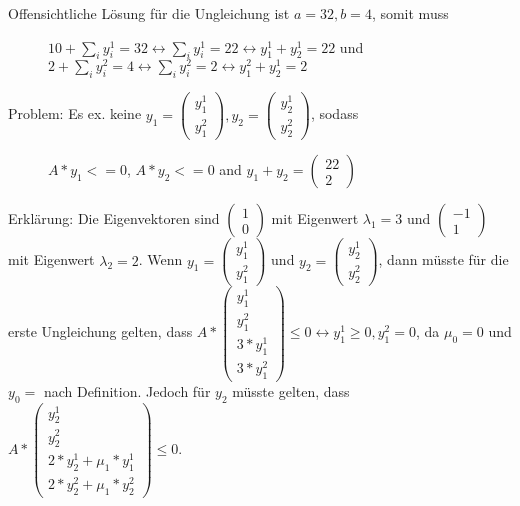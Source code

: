 \begin{itemize}
		\newline
		Offensichtliche Lösung für die Ungleichung ist $a=32, b=4$, somit muss 
			\begin{figure}[H] 
				\centering 
				$10 + \sum_{i}y_i^1=32 \leftrightarrow \sum_{i}y_i^1=22 \leftrightarrow y_1^1+y_2^1=22$ und \\
				$2 + \sum_{i}y_i^2 = 4 \leftrightarrow \sum_{i}y_i^2=2 \leftrightarrow y_1^2+y_2^1=2$			
			\end{figure}
		Problem: \newline
		 Es ex. keine $y_1=\begin{pmatrix} y_1^1 \\ y_1^2 \end{pmatrix}, y_2=\begin{pmatrix} y_2^1 \\ y_2^2 \end{pmatrix}$, sodass
			\begin{figure}[H]
				\centering
				$A*y_1<=0$, $ A*y_2<=0$ and $y_1+y_2=\begin{pmatrix} 22 \\ 2 \end{pmatrix}$
			\end{figure}
		Erklärung:\newline
		Die Eigenvektoren sind $\begin{pmatrix} 1 \\ 0 \end{pmatrix}$ mit Eigenwert $\lambda_1=3$ und $\begin{pmatrix} -1 \\ 1 \end{pmatrix}$ mit Eigenwert $\lambda_2=2 $. Wenn $y_1=\begin{pmatrix} y_1^1 \\ y_1^2 \end{pmatrix}$ und $y_2=\begin{pmatrix} y_2^1 \\ y_2^2 \end{pmatrix}$, dann müsste für die erste Ungleichung gelten, dass $A*\begin{pmatrix} y_1^1 \\ y_1^2 \\ 3*y_1^1 \\ 3*y_1^2 \end{pmatrix}\le 0 \leftrightarrow y_1^1 \ge 0, y_1^2 = 0$, da $\mu_0 = 0$ und $y_0 = $ nach Definition.\newline
		Jedoch für $y_2$ müsste gelten, dass $A*\begin{pmatrix} y_2^1 \\ y_2^2 \\ 2*y_2^1 + \mu_1*y_1^1\\ 2*y_2^2 + \mu_1*y_2^2 \end{pmatrix}\le 0$. \newline

\end{itemize}
